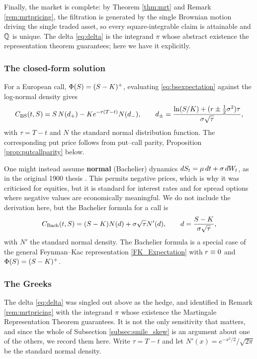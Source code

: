 Finally, the market is complete: by Theorem \ref{thm:mrt} and Remark \ref{rem:mrtpricing}, the 
filtration is generated by the single Brownian motion driving the single traded asset, so every 
square-integrable claim is attainable and $\mathbb{Q}$ is unique. The delta \eqref{eq:delta} is the
integrand $\pi$ whose abstract existence the representation theorem guarantees; here we have it
explicitly.

\subsubsection*{The closed-form solution}

For a European call, $\Phi(S)=(S-K)^+$, evaluating \eqref{eq:bsexpectation} 
against the log-normal density gives
\begin{equation}\label{eq:bscall}
    C_{\mathrm{BS}}(t,S) = S \, N(d_+) - K e^{-r(T-t)} N(d_-), 
    \qquad d_{\pm} = \frac{\ln(S/K) + (r \pm \tfrac12\sigma^2)\tau}{\sigma\sqrt{\tau}},
\end{equation}
with $\tau = T-t$ and $N$ the standard normal distribution function. The corresponding put price 
follows from put--call parity, Proposition \ref{prop:putcallparity} below.

One might instead assume \textbf{normal} (Bachelier) dynamics $dS_t = \mu\,dt + \sigma\,dW_t$,
as in the original 1900 thesis \cite{bachelier1900}. This permits negative prices, which is why it was criticised for
equities, but it is standard for interest rates and for spread options where negative values are
economically meaningful. We do not include the derivation here, but the Bachelier formula for a call is
\begin{equation}\label{eq:bacheliercall}
    C_{\mathrm{Bach}}(t,S) = (S-K) N(d) + \sigma\sqrt{\tau} N'(d), \qquad d = \frac{S-K}{\sigma\sqrt{\tau}},
\end{equation}
with $N'$ the standard normal density. The Bachelier formula is a special case of the general Feynman--Kac representation \eqref{FK_Expectation} with $r \equiv 0$ and $\Phi(S) = (S-K)^+$.

\subsubsection*{The Greeks}

The delta \eqref{eq:delta} was singled out above as the hedge, and identified in Remark
\ref{rem:mrtpricing} with the integrand $\pi$ whose existence the Martingale Representation
Theorem guarantees. It is not the only sensitivity that matters, and since the whole of Subsection
\ref{subsec:smile_skew} is an argument about one of the others, we record them here. Write
$\tau = T-t$ and let $N'(x) = e^{-x^2/2}/\sqrt{2\pi}$ be the standard normal density.

